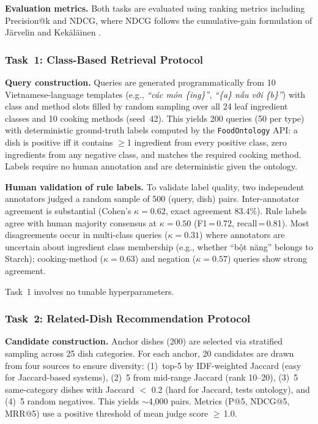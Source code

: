 \textbf{Evaluation metrics.}
Both tasks are evaluated using ranking metrics including Precision@k and NDCG, where NDCG follows the cumulative-gain formulation of J\"arvelin and Kek\"al\"ainen \cite{jarvelin2002cg}.

\subsubsection{Task~1: Class-Based Retrieval Protocol}
\label{sssec:eval_task1}
\hfill\break\indent\textbf{Query construction.}
Queries are generated programmatically from 10 Vietnamese-language templates (e.g., \textit{``các món \{ing\}''}, \textit{``\{a\} nấu với \{b\}''}) with class and method slots filled by random sampling over all 24 leaf ingredient classes and 10 cooking methods (seed~42). This yields 200 queries (50 per type) with deterministic ground-truth labels computed by the \texttt{FoodOntology} API: a dish is positive iff it contains $\geq$1 ingredient from every positive class, zero ingredients from any negative class, and matches the required cooking method. Labels require no human annotation and are deterministic given the ontology.

\textbf{Human validation of rule labels.}
To validate label quality, two independent annotators judged a random sample of 500 (query, dish) pairs. Inter-annotator agreement is substantial (Cohen's $\kappa = 0.62$, exact agreement 83.4\%). Rule labels agree with human majority consensus at $\kappa = 0.50$ (F1\,=\,0.72, recall\,=\,0.81). Most disagreements occur in multi-class queries ($\kappa = 0.31$) where annotators are uncertain about ingredient class membership (e.g., whether ``bột năng'' belongs to Starch); cooking-method ($\kappa = 0.63$) and negation ($\kappa = 0.57$) queries show strong agreement.

Task~1 involves no tunable hyperparameters.

\subsubsection{Task~2: Related-Dish Recommendation Protocol}
\label{sssec:eval_task2}
\hfill\break\indent\textbf{Candidate construction.}
Anchor dishes (200) are selected via stratified sampling across 25 dish categories. For each anchor, 20 candidates are drawn from four sources to ensure diversity: (1)~top-5 by IDF-weighted Jaccard (easy for Jaccard-based systems), (2)~5 from mid-range Jaccard (rank 10--20), (3)~5 same-category dishes with Jaccard $<$ 0.2 (hard for Jaccard, tests ontology), and (4)~5 random negatives. This yields ${\sim}$4{,}000 pairs. Metrics (P@5, NDCG@5, MRR@5) use a positive threshold of mean judge score $\geq$\,1.0.


